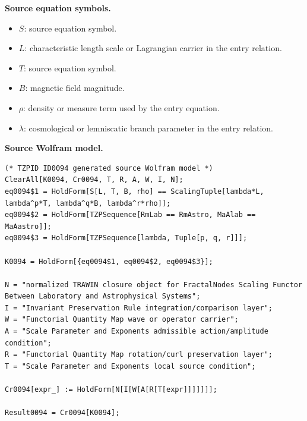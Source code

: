 \begin{minipage}[t]{0.49\linewidth}
\begingroup
\small
\raggedright
\textbf{Source equation symbols.}\par
\begin{itemize}[leftmargin=1.35em,itemsep=1pt,topsep=1pt,parsep=0pt]
    \item $S$: source equation symbol.
    \item $L$: characteristic length scale or Lagrangian carrier in the entry relation.
    \item $T$: source equation symbol.
    \item $B$: magnetic field magnitude.
    \item $\rho$: density or measure term used by the entry equation.
    \item $\lambda$: cosmological or lemniscatic branch parameter in the entry relation.
\end{itemize}
\endgroup
\end{minipage}\hfill
\begin{minipage}[t]{0.47\linewidth}
\begingroup
\scriptsize
\raggedright
\textbf{Source Wolfram model.}\par
\begin{Verbatim}[fontsize=\tiny,breaklines=true,breakanywhere=true]
(* TZPID ID0094 generated source Wolfram model *)
ClearAll[K0094, Cr0094, T, R, A, W, I, N];
eq0094$1 = HoldForm[S[L, T, B, rho] == ScalingTuple[lambda*L, lambda^p*T, lambda^q*B, lambda^r*rho]];
eq0094$2 = HoldForm[TZPSequence[RmLab == RmAstro, MaAlab == MaAastro]];
eq0094$3 = HoldForm[TZPSequence[lambda, Tuple[p, q, r]]];

K0094 = HoldForm[{eq0094$1, eq0094$2, eq0094$3}];

N = "normalized TRAWIN closure object for FractalNodes Scaling Functor Between Laboratory and Astrophysical Systems";
I = "Invariant Preservation Rule integration/comparison layer";
W = "Functorial Quantity Map wave or operator carrier";
A = "Scale Parameter and Exponents admissible action/amplitude condition";
R = "Functorial Quantity Map rotation/curl preservation layer";
T = "Scale Parameter and Exponents local source condition";

Cr0094[expr_] := HoldForm[N[I[W[A[R[T[expr]]]]]]];

Result0094 = Cr0094[K0094];
\end{Verbatim}
\endgroup
\end{minipage}


